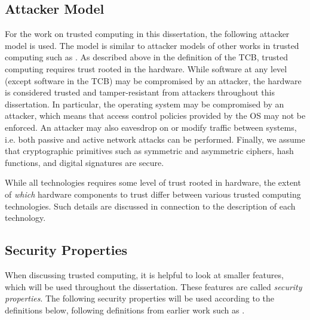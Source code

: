 \subsection{Attacker Model}
\label{sec:kappa-attackermodel}

For the work on trusted computing in this dissertation, the following attacker model is used.
The model is similar to attacker models of other works in trusted computing such as \cite{maene:2018,peters:2017}.
As described above in the definition of the TCB, trusted computing requires trust rooted in the hardware.
While software at any level (except software in the TCB) may be compromised by an attacker, the hardware is considered trusted and tamper-resistant from attackers throughout this dissertation.
In particular, the operating system may be compromised by an attacker, which means that access control policies provided by the OS may not be enforced.
An attacker may also eavesdrop on or modify traffic between systems, i.e. both passive and active network attacks can be performed.
Finally, we assume that cryptographic primitives such as symmetric and asymmetric ciphers, hash functions, and digital signatures are secure.

While all technologies requires some level of trust rooted in hardware, the extent of \emph{which} hardware components to trust differ between various trusted computing technologies.
Such details are discussed in connection to the description of each technology.

\subsection{Security Properties}
\label{sec:kappa-secprop}

When discussing trusted computing, it is helpful to look at smaller features, which will be used throughout the dissertation.
These features are called \emph{security properties}.
The following security properties will be used according to the definitions below, following definitions from earlier work such as \cite{maene:2018,vasudevan:2012}.

